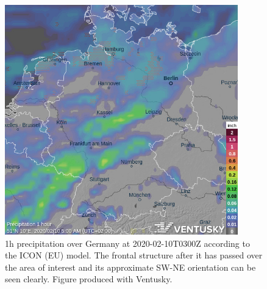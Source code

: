 \begin{figure}
    \centering
    \includegraphics[width=0.9\textwidth]{ventusky-rain-1h-20200210t0300-51n10e.jpg}
    \caption{1h precipitation over Germany at 2020-02-10T0300Z according to the ICON (EU) model. The frontal structure after it has passed over the area of interest and its approximate SW-NE orientation can be seen clearly. Figure produced with Ventusky.}
    \label{fig:ventusky1}
\end{figure}


